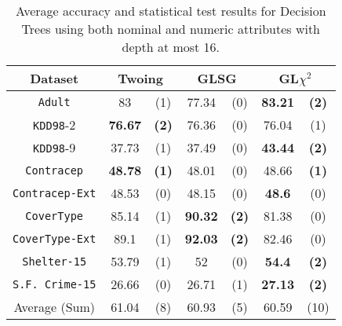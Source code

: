 \begin{table}
\small
\caption{Average accuracy and statistical test results for  Decision Trees using both nominal and numeric attributes with depth at most 16.}
\centering
\begin{tabular}{c|cc|cc|cc} 
Dataset              &        \multicolumn{2}{c|}{Twoing} &   \multicolumn{2}{c|}{GLSG} &   \multicolumn{2}{c}{GL$\chi^2$} \\  \hline   
{\tt Adult}          &  83            &  (1)              &  77.34      &  (0)          &  {\bf 83.21} &  {\bf (2)}        \\
{\tt KDD98}-2        &  {\bf 76.67}   &  {\bf (2)}        &  76.36      &  (0)          &  76.04       &  (1)              \\
{\tt KDD98}-9        &  37.73         &  (1)              &  37.49      &  (0)          &  {\bf 43.44} &  {\bf (2)}        \\
{\tt Contracep}      &  {\bf 48.78}   &  {\bf (1)}        &  48.01      &  (0)          &  48.66       &  {\bf (1)}        \\
{\tt Contracep-Ext}  &  48.53         &  (0)              &  48.15      &  (0)          &  {\bf 48.6}  &  (0)              \\
{\tt CoverType}      &  85.14         &  (1)              &  {\bf 90.32}&  {\bf (2)}    &  81.38       &  (0)              \\
{\tt CoverType-Ext}  &  89.1          &  (1)              &  {\bf 92.03}&  {\bf (2)}    &  82.46       &  (0)              \\
{\tt Shelter-15}     &  53.79         &  (1)              &  52         &  (0)          &  {\bf 54.4}  &  {\bf (2)}        \\   
{\tt S.F. Crime-15}  &  26.66         &  (0)              &  26.71      &  (1)          &  {\bf 27.13} &  {\bf (2)}        \\
\hline
Average (Sum)        &   61.04        &  (8)              & 60.93       & (5)           &   60.59     & (10)

\end{tabular}
\label{exp:secondsetnumeric}
\normalsize
\end{table}





